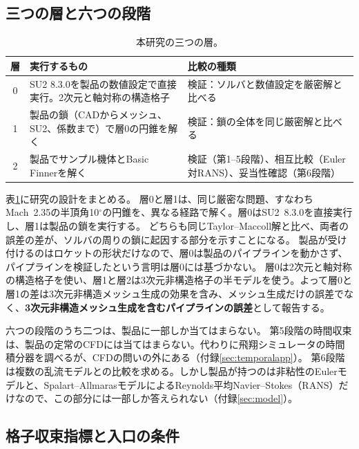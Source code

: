 \documentclass[twocolumn]{labreport}
\begin{document}
\subsection{三つの層と六つの段階}
\label{sec:layers}

\begin{table}[b]
\centering
\caption{本研究の三つの層。}
\label{tab:layers}
\small
\begin{tabular}{@{}c>{\raggedright\arraybackslash}p{3.5cm}>{\raggedright\arraybackslash}p{3.6cm}@{}}
\toprule
層 & 実行するもの & 比較の種類 \\
\midrule
0 & SU2 8.3.0を製品の数値設定で直接実行。2次元と軸対称の構造格子
  & 検証：ソルバと数値設定を厳密解と比べる \\
1 & 製品の鎖（CADからメッシュ、SU2、係数まで）で層0の円錐を解く
  & 検証：鎖の全体を同じ厳密解と比べる \\
2 & 製品でサンプル機体とBasic Finnerを解く
  & 検証（第1--5段階）、相互比較（Euler対RANS）、妥当性確認（第6段階） \\
\bottomrule
\end{tabular}
\end{table}

表\ref{tab:layers}に研究の設計をまとめる。
層0と層1は、同じ厳密な問題、すなわちMach~2.35の半頂角10$^\circ$の円錐を、異なる経路で解く。層0はSU2~8.3.0を直接実行し、層1は製品の鎖を実行する。
どちらも同じTaylor--Maccoll解と比べ、両者の誤差の差が、ソルバの周りの鎖に起因する部分を示すことになる。
製品が受け付けるのはロケットの形状だけなので、層0は製品のパイプラインを動かさず、パイプラインを検証したという言明は層0には基づかない。
層0は2次元と軸対称の構造格子を使い、層1と層2は3次元非構造格子の半モデルを使う。よって層0と層1の差は3次元非構造メッシュ生成の効果を含み、メッシュ生成だけの誤差でなく、\textbf{3次元非構造メッシュ生成を含むパイプラインの誤差}として報告する。

六つの段階のうち二つは、製品に一部しか当てはまらない。
第5段階の時間収束は、製品の定常のCFDには当てはまらない。代わりに飛翔シミュレータの時間積分器を調べるが、CFDの問いの外にある（付録\ref{sec:temporalapp}）。
第6段階は複数の乱流モデルとの比較を求める。しかし製品が持つのは非粘性のEulerモデルと、Spalart--Allmarasモデル\citep{spalart1992}によるReynolds平均Navier--Stokes（RANS）だけなので、この部分には一部しか答えられない（付録\ref{sec:model}）。

\subsection{格子収束指標と入口の条件}
\label{sec:gci}
\end{document}
